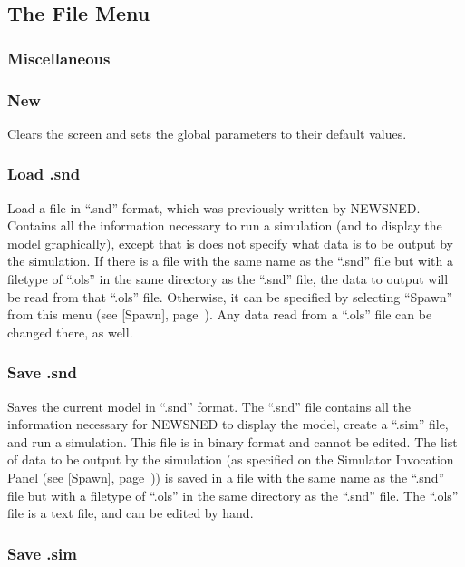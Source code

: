 \documentclass[12pt,openany,oneside]{book}
\newcommand{\tipxref}[1]{see [#1], page~\pageref{#1}}
\begin{document}
\subsection{The File Menu}


\subsubsection{Miscellaneous}

\subsubsection*{New}

Clears the screen and sets the global parameters to their default
values.

\subsubsection*{Load .snd}
\label{Load .snd}

Load a file in ``.snd'' format, which was previously written by
NEWSNED.  Contains all the information necessary to run a simulation
(and to display the model graphically), except that is does not
specify what data is to be output by the simulation.  If there is a
file with the same name as the ``.snd'' file but with a filetype of
``.ols'' in the same directory as the ``.snd'' file, the data to
output will be read from that ``.ols'' file.  Otherwise, it can be
specified by selecting ``Spawn'' from this menu (\tipxref{Spawn}).  Any
data read from a ``.ols'' file can be changed there, as well.

\subsubsection*{Save .snd}

Saves the current model in ``.snd'' format.  The ``.snd'' file
contains all the information necessary for NEWSNED to display the
model, create a ``.sim'' file, and run a simulation.  This file is in
binary format and cannot be edited.  The list of data to be output by
the simulation (as specified on the Simulator Invocation Panel
(\tipxref{Spawn})) is saved in a file with the same name as the ``.snd''
file but with a filetype of ``.ols'' in the same directory as the
``.snd'' file.  The ``.ols'' file is a text file, and can be edited by
hand.

\subsubsection*{Save .sim}
\end{document}
